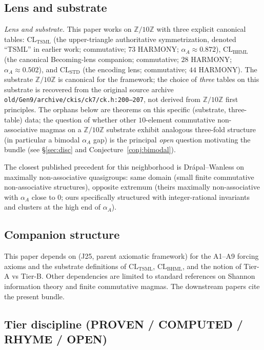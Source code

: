 \documentclass[11pt,reqno]{amsart}
\theoremstyle{plain}
\theoremstyle{definition}
\theoremstyle{remark}
\newcommand{\Z}{\mathbb{Z}}
\newcommand{\TSML}{\mathrm{TSML}}
\newcommand{\BHML}{\mathrm{BHML}}
\newcommand{\STD}{\mathrm{STD}}
\begin{document}
\subsection{Lens and substrate}\label{sec:lens-substrate}

\noindent\emph{Lens and substrate.} This paper works on $\Z/10\Z$ with
three explicit canonical tables: $\mathrm{CL}_\TSML$ (the
upper-triangle authoritative symmetrization, denoted ``TSML'' in
earlier work; commutative; $73$ HARMONY; $\alpha_A \approx 0.872$),
$\mathrm{CL}_\BHML$ (the canonical Becoming-lens companion;
commutative; $28$ HARMONY; $\alpha_A \approx 0.502$), and
$\mathrm{CL}_\STD$ (the encoding lens; commutative; $44$ HARMONY).
The substrate $\Z/10\Z$ is canonical for the framework; the choice of
\emph{three} tables on this substrate is recovered from the original
source archive \texttt{old/Gen9/archive/ckis/ck7/ck.h:200--207}, not
derived from $\Z/10\Z$ first principles. The orphans below are
theorems on this specific (substrate, three-table) data; the
question of whether other $10$-element commutative non-associative
magmas on a $\Z/10\Z$ substrate exhibit analogous three-fold
structure (in particular a bimodal $\alpha_A$ gap) is the principal
\emph{open} question motivating the bundle (see \S\ref{sec:disc} and
Conjecture~\ref{conj:bimodal}).

The closest published precedent for this neighborhood is
Dr\'apal--Wanless \cite{DrapalWanless2021} on maximally
non-associative quasigroups: same domain (small finite commutative
non-associative structures), opposite extremum (theirs maximally
non-associative with $\alpha_A$ close to $0$; ours specifically
structured with integer-rational invariants and clusters at the high
end of $\alpha_A$).

\subsection{Companion structure}\label{sec:companion}

This paper depends on \cite{SandersForcing} (J25, parent axiomatic
framework) for the A1--A9 forcing axioms and the substrate
definitions of $\mathrm{CL}_\TSML$, $\mathrm{CL}_\BHML$, and the
notion of Tier-A vs Tier-B. Other dependencies are limited to
standard references on Shannon information theory and finite
commutative magmas. The downstream papers
\cite{SandersGishFourCore,SandersGishSO8,SandersGishSO10} cite the
present bundle.

\subsection{Tier discipline (PROVEN / COMPUTED / RHYME / OPEN)}
\label{sec:tier-discipline}
\end{document}
